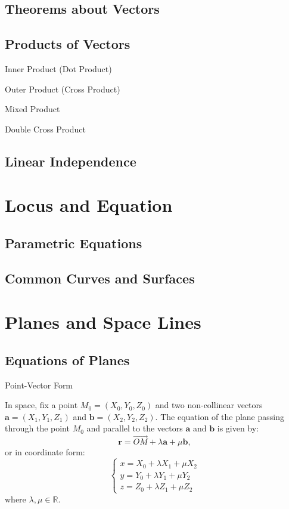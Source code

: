 \documentclass[11pt]{../../TexTemplate/elegantbook} %
\begin{document}
\section{Theorems about Vectors}

\section{Products of Vectors}
\begin{leftbarTitle}{Inner Product (Dot Product)}\end{leftbarTitle}

\begin{leftbarTitle}{Outer Product (Cross Product)}\end{leftbarTitle}

\begin{leftbarTitle}{Mixed Product}\end{leftbarTitle}

\begin{leftbarTitle}{Double Cross Product}\end{leftbarTitle}

\section{Linear Independence}

\chapter{Locus and Equation}
\section{Parametric Equations}

\section{Common Curves and Surfaces}

\chapter{Planes and Space Lines}
\section{Equations of Planes}
\begin{leftbarTitle}{Point-Vector Form}\end{leftbarTitle}
In space, fix a point \(M_{0} = (X_{0}, Y_{0}, Z_{0})\) and two non-collinear vectors \(\mathbf{a} = (X_{1}, Y_{1}, Z_{1})\) 
and \(\mathbf{b} = (X_{2}, Y_{2}, Z_{2})\).
The equation of the plane passing through the point \(M_{0}\) and 
parallel to the vectors \(\mathbf{a}\) and \(\mathbf{b}\) is given by:
\[
\mathbf{r} = \vec{OM} + \lambda \mathbf{a} + \mu \mathbf{b},
\]
or in coordinate form:
\[
\begin{cases}
x = X_{0} + \lambda X_{1} + \mu X_{2} \\
y = Y_{0} + \lambda Y_{1} + \mu Y_{2} \\
z = Z_{0} + \lambda Z_{1} + \mu Z_{2}
\end{cases}
\]
where \(\lambda, \mu \in \mathbb{R}\).
\end{document}
